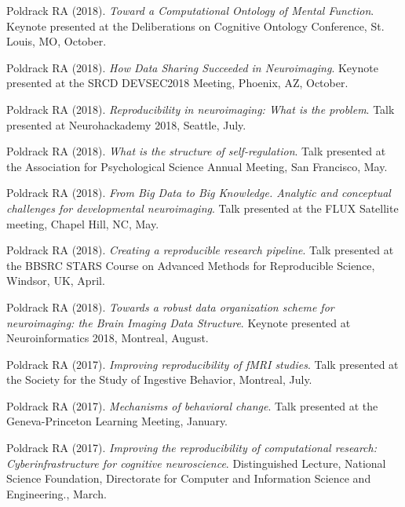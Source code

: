 Poldrack RA (2018). \emph{Toward a Computational Ontology of Mental Function}. Keynote presented at the Deliberations on Cognitive Ontology Conference, St. Louis, MO, October. \vspace{2mm} 

Poldrack RA (2018). \emph{How Data Sharing Succeeded in Neuroimaging}. Keynote presented at the SRCD DEVSEC2018 Meeting, Phoenix, AZ, October. \vspace{2mm} 

Poldrack RA (2018). \emph{Reproducibility in neuroimaging: What is the problem}. Talk presented at Neurohackademy 2018, Seattle, July. \vspace{2mm} 

Poldrack RA (2018). \emph{What is the structure of self-regulation}. Talk presented at the Association for Psychological Science Annual Meeting, San Francisco, May. \vspace{2mm} 

Poldrack RA (2018). \emph{From Big Data to Big Knowledge. Analytic and conceptual challenges for developmental neuroimaging}. Talk presented at the FLUX Satellite meeting, Chapel Hill, NC, May. \vspace{2mm} 

Poldrack RA (2018). \emph{Creating a reproducible research pipeline}. Talk presented at the BBSRC STARS Course on Advanced Methods for Reproducible Science, Windsor, UK, April. \vspace{2mm} 

Poldrack RA (2018). \emph{Towards a robust data organization scheme for neuroimaging: the Brain Imaging Data Structure}. Keynote presented at Neuroinformatics 2018, Montreal, August. \vspace{2mm} 

Poldrack RA (2017). \emph{Improving reproducibility of fMRI studies}. Talk presented at the Society for the Study of Ingestive Behavior, Montreal, July. \vspace{2mm} 

Poldrack RA (2017). \emph{Mechanisms of behavioral change}. Talk presented at the Geneva-Princeton Learning Meeting, January. \vspace{2mm} 

Poldrack RA (2017). \emph{Improving the reproducibility of computational research: Cyberinfrastructure for cognitive neuroscience}. Distinguished Lecture, National Science Foundation, Directorate for Computer and Information Science and Engineering., March. \vspace{2mm} 

